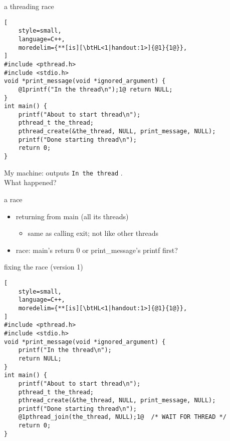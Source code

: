 
\begin{frame}[fragile,label=pthreadCreateBrokenP]{a threading race}
\begin{lstlisting}[
    style=small,
    language=C++,
    moredelim={**[is][\btHL<1|handout:1>]{@1}{1@}},
]
#include <pthread.h>
#include <stdio.h>
void *print_message(void *ignored_argument) {
    @1printf("In the thread\n");1@ return NULL;
}
int main() {
    printf("About to start thread\n");
    pthread_t the_thread;
    pthread_create(&the_thread, NULL, print_message, NULL);
    printf("Done starting thread\n");
    return 0;
}
\end{lstlisting}
My machine: outputs \texttt{In the thread} . \\
What happened?
\end{frame}

\begin{frame}[fragile,label=pthreadCreateRace]{a race}
\begin{itemize}
\item returning from main  (all its threads)
    \begin{itemize}
    \item same as calling exit; not like other threads
    \end{itemize}
\item race: main's return 0 or print\_message's printf first?
\end{itemize}
\end{frame}

\begin{frame}[fragile,label=fixRace1]{fixing the race (version 1)}
\begin{lstlisting}[
    style=small,
    language=C++,
    moredelim={**[is][\btHL<1|handout:1>]{@1}{1@}},
]
#include <pthread.h>
#include <stdio.h>
void *print_message(void *ignored_argument) {
    printf("In the thread\n");
    return NULL;
}
int main() {
    printf("About to start thread\n");
    pthread_t the_thread;
    pthread_create(&the_thread, NULL, print_message, NULL);
    printf("Done starting thread\n");
    @1pthread_join(the_thread, NULL);1@  /* WAIT FOR THREAD */
    return 0;
}
\end{lstlisting}
\end{frame}

